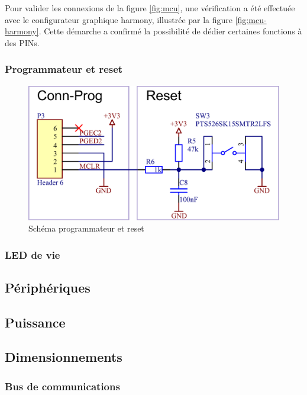 Pour valider les connexions de la figure \ref{fig:mcu}, une vérification a été effectuée avec le configurateur graphique \gls{harmony}, illustrée par la figure \ref{fig:mcu-harmony}. Cette démarche a confirmé la possibilité de dédier certaines fonctions à des PINs.

\subsubsection{Programmateur et reset} 


\begin{figure}[h]
	\centering
	\includegraphics[width=0.7\linewidth]{../figures/etude/sch/Prog-Reset}
	\caption{Schéma programmateur et reset}
	\label{fig:prog-reset}
\end{figure}

\subsubsection{LED de vie} 

\subsection{Périphériques} \label{ssec:Dev-Devices}

\subsection{Puissance} \label{ssec:Dev-Power}

\subsection{Dimensionnements} \label{ssec:Dev-Dimensionnements}

\subsubsection{Bus de communications} \label{sssec:Dev-BusComm}

